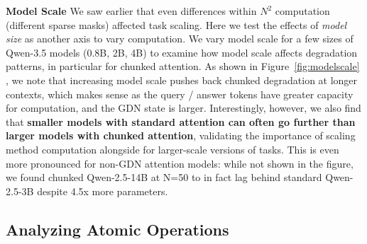 



\textbf{Model Scale} We saw earlier that even differences within $N^2$ computation (different sparse masks) affected task scaling. Here we test the effects of \emph{model size} as another axis to vary computation. We vary model scale for a few sizes of Qwen-3.5 models (0.8B, 2B, 4B) to examine how model scale affects degradation patterns, in particular for chunked attention. As shown in Figure~\ref{fig:modelscale} , we note that increasing model scale pushes back chunked degradation at longer contexts, which makes sense as the query / answer tokens have greater capacity for computation, and the GDN state is larger. Interestingly, however, we also find that \textbf{smaller models with standard attention can often go further than larger models with chunked attention}, validating the importance of scaling method computation alongside \cname for larger-scale versions of tasks. This is even more pronounced for non-GDN attention models: while not shown in the figure, we found chunked Qwen-2.5-14B at N=50 to in fact lag behind standard Qwen-2.5-3B despite 4.5x more parameters.


\subsection{Analyzing Atomic Operations}




